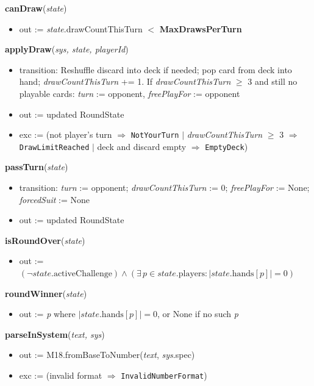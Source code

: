 \documentclass[12pt, titlepage]{article}
\begin{document}
\noindent\textbf{canDraw}(\textit{state})
\begin{itemize}
    \item out := \textit{state}.drawCountThisTurn $<$ \textbf{MaxDrawsPerTurn}
\end{itemize}

\noindent\textbf{applyDraw}(\textit{sys, state, playerId})
\begin{itemize}
    \item transition: Reshuffle discard into deck if needed; pop card from deck into hand; \textit{drawCountThisTurn} += 1. If \textit{drawCountThisTurn} $\geq$ 3 and still no playable cards: \textit{turn} := opponent, \textit{freePlayFor} := opponent
    \item out := updated RoundState
    \item exc := (not player's turn $\Rightarrow$ \texttt{NotYourTurn} $|$ \textit{drawCountThisTurn} $\geq$ 3 $\Rightarrow$ \texttt{DrawLimitReached} $|$ deck and discard empty $\Rightarrow$ \texttt{EmptyDeck})
\end{itemize}

\noindent\textbf{passTurn}(\textit{state})
\begin{itemize}
    \item transition: \textit{turn} := opponent; \textit{drawCountThisTurn} := 0; \textit{freePlayFor} := None; \textit{forcedSuit} := None
    \item out := updated RoundState
\end{itemize}

\noindent\textbf{isRoundOver}(\textit{state})
\begin{itemize}
    \item out := $(\neg\textit{state}.\text{activeChallenge}) \wedge (\exists\, p \in \textit{state}.\text{players} : |\textit{state}.\text{hands}[p]| = 0)$
\end{itemize}

\noindent\textbf{roundWinner}(\textit{state})
\begin{itemize}
    \item out := \textit{p} where $|\textit{state}.\text{hands}[p]| = 0$, or None if no such \textit{p}
\end{itemize}

\noindent\textbf{parseInSystem}(\textit{text, sys})
\begin{itemize}
    \item out := M18.fromBaseToNumber(\textit{text}, \textit{sys}.spec)
    \item exc := (invalid format $\Rightarrow$ \texttt{InvalidNumberFormat})
\end{itemize}
\end{document}
